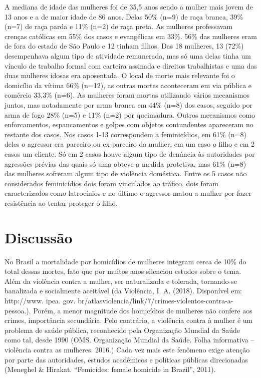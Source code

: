 A mediana de idade das mulheres foi de 35,5 anos sendo a mulher mais jovem de 13 anos e a de maior idade de 86 anos. Delas 50\% (n=9) de raça branca, 39\% (n=7) de raça parda e 11\% (n=2) de raça preta.  As mulheres professavam crenças católicas em 55\% dos casos e evangélicas em 33\%. 56\% das mulheres eram de fora do estado de São Paulo e 12 tinham filhos.
Das 18 mulheres, 13 (72\%) desempenhava algum tipo de atividade remunerada, mas só uma delas tinha um vínculo de trabalho formal com carteira assinada e direitos trabalhistas e uma das duas mulheres idosas era aposentada. O local de morte mais relevante foi o domicílio da vítima 66\% (n=12), as outras mortes aconteceram em via pública e comércio 33,3\% (n=6). As mulheres foram mortas utilizando vários mecanismos juntos, mas notadamente por arma branca em 44\% (n=8) dos casos, seguido por arma de fogo 28\% (n=5) e 11\% (n=2) por queimadura. Outros mecanismos como enforcamentos, espancamentos e golpes com objetos contundentes apareceram no restante dos casos. 
Nos casos 1-13 correspondem a feminicídios, em 61\% (n=8) deles o agressor era parceiro ou ex-parceiro da mulher, em um caso o filho e em 2 casos um cliente. Só em 2 casos houve algum tipo de denúncia às autoridades por agressões prévias das quais só uma obteve a medida protetiva, mas 61\% (n=8) das mulheres sofreram algum tipo de violência doméstica. 
Entre os 5 casos não considerados feminicídios dois foram vinculados ao tráfico, dois foram caracterizados como latrocínios e no último o agressor matou a mulher por fazer resistência ao tentar proteger o filho. 


\section{Discussão}

No Brasil a mortalidade por homicídios de mulheres integram cerca de 10\% do total dessas mortes, fato que por muitos anos silenciou estudos sobre o tema. Além da violência contra a mulher, ser naturalizada e tolerada, tornando-se banalizada e socialmente aceitável (da Violência, I. A. (2018). Disponível em: http://www. ipea. gov. br/atlasviolencia/link/7/crimes-violentos-contra-a-pessoa.). Porém, a menor magnitude dos homicídios de mulheres não confere aos crimes, importância secundária.  Pelo contrário, a violência contra à mulher é um problema de saúde pública, reconhecido pela Organização Mundial da Saúde como tal, desde 1990 (OMS. Organização Mundial da Saúde. Folha informativa – violência contra as mulheres. 2016.) Cada vez mais este fenômeno exige atenção por parte das autoridades, estudos acadêmicos e políticas públicas direcionadas  (Meneghel & Hirakat. “Femicides: female homicide in Brazil”, 2011).

